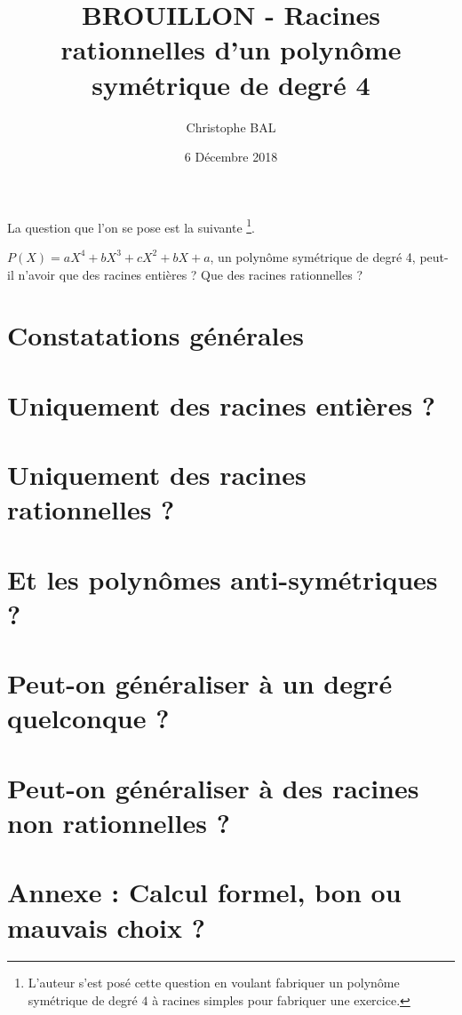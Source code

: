 \documentclass[12pt]{amsart}
\begin{document}
\title{BROUILLON - Racines rationnelles d'un polynôme symétrique de degré 4}
\author{Christophe BAL}
\date{6 Décembre 2018}
\maketitle


La question que l'on se pose est la suivante
\footnote{
	L'auteur s'est posé cette question en voulant fabriquer un polynôme symétrique de degré $4$ à racines \og simples \fg{} pour fabriquer une exercice.
}.

\begin{tcolorbox}
	$P(X) = a X^4 + b X^3 + c X^2 + b X + a$, un polynôme symétrique de degré 4, peut-il n'avoir que des racines entières ? Que des racines rationnelles ?
\end{tcolorbox}


\setcounter{tocdepth}{1}
\tableofcontents



\section{Constatations générales}





\section{Uniquement des racines entières ?}





\section{Uniquement des racines rationnelles ?}





\section{Et les polynômes anti-symétriques ?}





\section{Peut-on généraliser à un degré quelconque ?}





\section{Peut-on généraliser à des racines non rationnelles ?}





\section*{Annexe : Calcul formel, bon ou mauvais choix ?}


\end{document}
